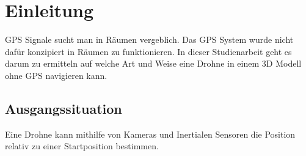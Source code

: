 \chapter{Einleitung}

GPS Signale sucht man in Räumen vergeblich. Das GPS System wurde nicht dafür konzipiert in Räumen zu funktionieren.
In dieser Studienarbeit geht es darum zu ermitteln auf welche Art und Weise eine Drohne in einem 3D Modell ohne GPS navigieren kann.

\section{Ausgangssituation}

Eine Drohne kann mithilfe von Kameras und Inertialen Sensoren die Position relativ zu einer Startposition bestimmen.


